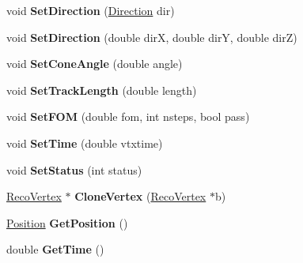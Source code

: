 \begin{DoxyCompactItemize}
\item 
\hypertarget{classRecoVertex_a297cc2a448a138af57a9698e7979fdc3}{void {\bfseries Set\-Direction} (\hyperlink{classDirection}{Direction} dir)}\label{classRecoVertex_a297cc2a448a138af57a9698e7979fdc3}

\item 
\hypertarget{classRecoVertex_abdebdcee7b218ddcf0cc2376f4374c6a}{void {\bfseries Set\-Direction} (double dir\-X, double dir\-Y, double dir\-Z)}\label{classRecoVertex_abdebdcee7b218ddcf0cc2376f4374c6a}

\item 
\hypertarget{classRecoVertex_ab5915f773f79307ecbff0d33b909428a}{void {\bfseries Set\-Cone\-Angle} (double angle)}\label{classRecoVertex_ab5915f773f79307ecbff0d33b909428a}

\item 
\hypertarget{classRecoVertex_a77b91d56b5561e736877b48b0d12d0b7}{void {\bfseries Set\-Track\-Length} (double length)}\label{classRecoVertex_a77b91d56b5561e736877b48b0d12d0b7}

\item 
\hypertarget{classRecoVertex_a49dccbc57793bb7db34e345377802283}{void {\bfseries Set\-F\-O\-M} (double fom, int nsteps, bool pass)}\label{classRecoVertex_a49dccbc57793bb7db34e345377802283}

\item 
\hypertarget{classRecoVertex_aa2d7a563db1be14ae5538dcc678a80d0}{void {\bfseries Set\-Time} (double vtxtime)}\label{classRecoVertex_aa2d7a563db1be14ae5538dcc678a80d0}

\item 
\hypertarget{classRecoVertex_af0040136fde1055f38e6c735daeab3a6}{void {\bfseries Set\-Status} (int status)}\label{classRecoVertex_af0040136fde1055f38e6c735daeab3a6}

\item 
\hypertarget{classRecoVertex_a99b74138ad6c4bf38f0a9ad57cac005a}{\hyperlink{classRecoVertex}{Reco\-Vertex} $\ast$ {\bfseries Clone\-Vertex} (\hyperlink{classRecoVertex}{Reco\-Vertex} $\ast$b)}\label{classRecoVertex_a99b74138ad6c4bf38f0a9ad57cac005a}

\item 
\hypertarget{classRecoVertex_a6963afc449afb852e849b6886b276c74}{\hyperlink{classPosition}{Position} {\bfseries Get\-Position} ()}\label{classRecoVertex_a6963afc449afb852e849b6886b276c74}

\item 
\hypertarget{classRecoVertex_a6d78ff11288221dc2e4b43d3863113a9}{double {\bfseries Get\-Time} ()}\label{classRecoVertex_a6d78ff11288221dc2e4b43d3863113a9}


\end{DoxyCompactItemize}
